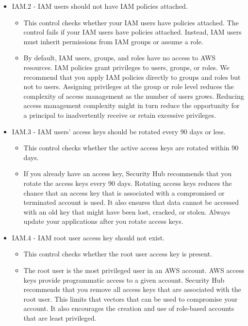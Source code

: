 \begin{mdframed}[backgroundcolor=gray!05, linecolor=gray!50]
\itshape
\begin{itemize}
    \item IAM.2 - IAM users should not have IAM policies attached.
    \begin{itemize}
        \item This control checks whether your IAM users have policies attached. The control fails if your IAM users have policies attached. Instead, IAM users must inherit permissions from IAM groups or assume a role.
        \item By default, IAM users, groups, and roles have no access to AWS resources. IAM policies grant privileges to users, groups, or roles. We recommend that you apply IAM policies directly to groups and roles but not to users. Assigning privileges at the group or role level reduces the complexity of access management as the number of users grows. Reducing access management complexity might in turn reduce the opportunity for a principal to inadvertently receive or retain excessive privileges.
    \end{itemize}
    \item IAM.3 - IAM users' access keys should be rotated every 90 days or less.
    \begin{itemize}
        \item This control checks whether the active access keys are rotated within 90 days.
        \item If you already have an access key, Security Hub recommends that you rotate the access keys every 90 days. Rotating access keys reduces the chance that an access key that is associated with a compromised or terminated account is used. It also ensures that data cannot be accessed with an old key that might have been lost, cracked, or stolen. Always update your applications after you rotate access keys.
    \end{itemize}
    \item IAM.4 - IAM root user access key should not exist.
    \begin{itemize}
        \item This control checks whether the root user access key is present.
        \item The root user is the most privileged user in an AWS account. AWS access keys provide programmatic access to a given account. Security Hub recommends that you remove all access keys that are associated with the root user. This limits that vectors that can be used to compromise your account. It also encourages the creation and use of role-based accounts that are least privileged.

\end{itemize}
\end{itemize}
\end{mdframed}
